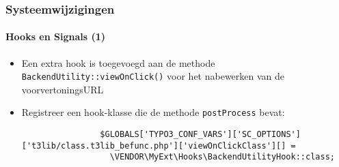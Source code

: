 \begin{frame}[fragile]
	\frametitle{Systeemwijzigingen}
	\framesubtitle{Hooks en Signals (1)}

	\lstset{basicstyle=\tiny\ttfamily}

	\begin{itemize}

		\item Een extra hook is toegevoegd aan de methode \texttt{BackendUtility::viewOnClick()}
			voor het nabewerken van de voorvertoningsURL

		\item Registreer een hook-klasse die de methode \texttt{postProcess} bevat:

			\begin{lstlisting}
				$GLOBALS['TYPO3_CONF_VARS']['SC_OPTIONS']['t3lib/class.t3lib_befunc.php']['viewOnClickClass'][] =
				  \VENDOR\MyExt\Hooks\BackendUtilityHook::class;
			\end{lstlisting}

	\end{itemize}

\end{frame}

